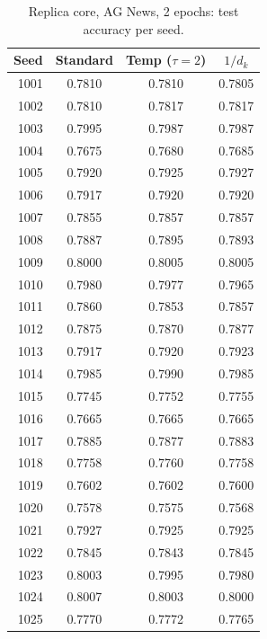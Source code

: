 \documentclass[10pt,a4paper]{article}
\newcommand{\dk}{d_k}
\begin{document}
\begin{table}[H]
  \centering
  \caption{Replica core, AG News, 2 epochs: test accuracy per seed.}
  \small
  \begin{tabular}{r c c c}
    \toprule
    \textbf{Seed} & \textbf{Standard} & \textbf{Temp ($\tau=2$)} & \textbf{$1/\dk$} \\
    \midrule
1001 & 0.7810 & 0.7810 & 0.7805 \\
1002 & 0.7810 & 0.7817 & 0.7817 \\
1003 & 0.7995 & 0.7987 & 0.7987 \\
1004 & 0.7675 & 0.7680 & 0.7685 \\
1005 & 0.7920 & 0.7925 & 0.7927 \\
1006 & 0.7917 & 0.7920 & 0.7920 \\
1007 & 0.7855 & 0.7857 & 0.7857 \\
1008 & 0.7887 & 0.7895 & 0.7893 \\
1009 & 0.8000 & 0.8005 & 0.8005 \\
1010 & 0.7980 & 0.7977 & 0.7965 \\
1011 & 0.7860 & 0.7853 & 0.7857 \\
1012 & 0.7875 & 0.7870 & 0.7877 \\
1013 & 0.7917 & 0.7920 & 0.7923 \\
1014 & 0.7985 & 0.7990 & 0.7985 \\
1015 & 0.7745 & 0.7752 & 0.7755 \\
1016 & 0.7665 & 0.7665 & 0.7665 \\
1017 & 0.7885 & 0.7877 & 0.7883 \\
1018 & 0.7758 & 0.7760 & 0.7758 \\
1019 & 0.7602 & 0.7602 & 0.7600 \\
1020 & 0.7578 & 0.7575 & 0.7568 \\
1021 & 0.7927 & 0.7925 & 0.7925 \\
1022 & 0.7845 & 0.7843 & 0.7845 \\
1023 & 0.8003 & 0.7995 & 0.7980 \\
1024 & 0.8007 & 0.8003 & 0.8000 \\
1025 & 0.7770 & 0.7772 & 0.7765 \\
    \bottomrule
  \end{tabular}
\end{table}
\end{document}
